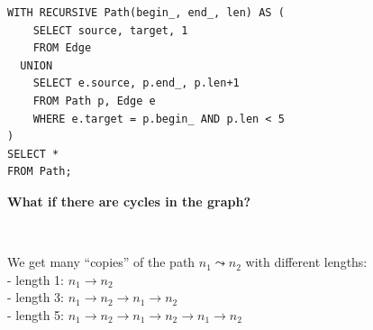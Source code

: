 \documentclass[xcolor={usenames,dvipsnames}]{beamer}
\begin{document}
\newsavebox\recursiveQueryOnGraphWithCycles
\begin{lrbox}{\recursiveQueryOnGraphWithCycles}
\begin{minipage}{0.675\textwidth}\begin{lstlisting}[style=SQL]
WITH RECURSIVE Path(begin_, end_, len) AS (
    SELECT source, target, 1
    FROM Edge
  UNION
    SELECT e.source, p.end_, p.len+1
    FROM Path p, Edge e
    WHERE e.target = p.begin_ AND p.len < 5
)
SELECT *
FROM Path;
\end{lstlisting}\end{minipage}
\end{lrbox}

%
%

\begin{frame}[fragile]
\label{recursionWithCycles}
\textbf{What if there are cycles in the graph?}

\begin{figure}
\begin{subfigure}{0.3\textwidth}
\usebox\GraphWithCycle
\end{subfigure}
~~~~~
\begin{subfigure}{0.6\textwidth}
\scalebox{0.75}{\fbox{\usebox\recursiveQueryOnGraphWithCycles}}
\end{subfigure}
\end{figure}

We get many ``copies'' of the path $n_1\leadsto n_2$ with different lengths:\\
 - length 1: $n_1\rightarrow n_2$ \\
 - length 3: $n_1\rightarrow n_2 \rightarrow n_1 \rightarrow n_2$ \\
 - length 5: $n_1\rightarrow n_2 \rightarrow n_1 \rightarrow n_2 \rightarrow n_1 \rightarrow n_2$ \\

\end{frame}


\end{document}
